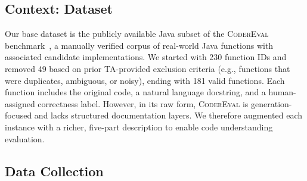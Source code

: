 \documentclass[a4paper]{usiinfbachelorproject}
\begin{document}
\subsection{Context: Dataset}\label{sec:dataset}
Our base dataset is the publicly available Java subset of the \textsc{CoderEval} benchmark~\cite{coderEval2023}, a manually verified corpus of real-world Java functions with associated candidate implementations. We started with 230 function IDs and removed 49 based on prior TA-provided exclusion criteria (e.g., functions that were duplicates, ambiguous, or noisy), ending with 181 valid functions. Each function includes the original code, a natural language docstring, and a human-assigned correctness label. However, in its raw form, \textsc{CoderEval} is generation-focused and lacks structured documentation layers. We therefore augmented each instance with a richer, five-part description to enable code understanding evaluation.

\subsection{Data Collection}\label{sec:collection}
\end{document}
